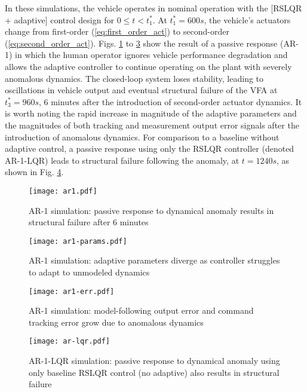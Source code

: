 In these simulations, the vehicle operates in nominal operation with the [RSLQR + adaptive] control design for $0 \leq t < t_1^*$. At $t_1^* = 600 s$, the vehicle's actuators change from first-order (\ref{eq:first_order_act}) to second-order (\ref{eq:second_order_act}). Figs. \ref{fig:ar1} to \ref{fig:ar1-err} show the result of a passive response (AR-1) in which the human operator ignores vehicle performance degradation and allows the adaptive controller to continue operating on the plant with severely anomalous dynamics. The closed-loop system loses stability, leading to oscillations in vehicle output and eventual structural failure of the VFA at $t_3^* = 960s$, 6 minutes after the introduction of second-order actuator dynamics. It is worth noting the rapid increase in magnitude of the adaptive parameters and the magnitudes of both tracking and measurement output error signals after the introduction of anomalous dynamics. For comparison to a baseline without adaptive control, a passive response using only the RSLQR controller (denoted AR-1-LQR) leads to structural failure following the anomaly, at $t = 1240s$, as shown in Fig. \ref{fig:ar-lqr}.

\begin{figure}[htbp]
	\centering
	\texttt{[image: ar1.pdf]}
	\caption{AR-1 simulation: passive response to dynamical anomaly results in structural failure after 6 minutes}
	\label{fig:ar1}
\end{figure}

\begin{figure}[htbp]
	\centering
	\texttt{[image: ar1-params.pdf]}
	\caption{AR-1 simulation: adaptive parameters diverge as controller struggles to adapt to unmodeled dynamics}
	\label{fig:ar1-params}
\end{figure}

\begin{figure}[htbp]
	\centering
	\texttt{[image: ar1-err.pdf]}
	\caption{AR-1 simulation: model-following output error and command tracking error grow due to anomalous dynamics}
	\label{fig:ar1-err}
\end{figure}

\begin{figure}[htbp]
	\centering
	\texttt{[image: ar-lqr.pdf]}
	\caption{AR-1-LQR simulation: passive response to dynamical anomaly using only baseline RSLQR control (no adaptive) also results in structural failure}
	\label{fig:ar-lqr}
\end{figure}

